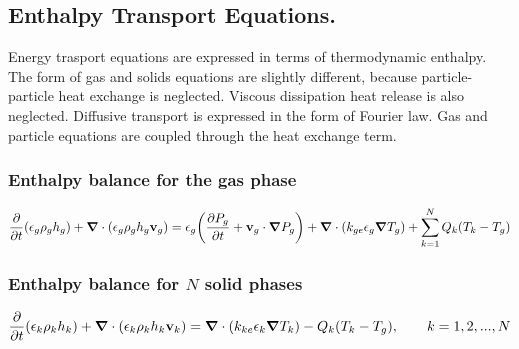 \subsection{Enthalpy Transport Equations.}
Energy trasport equations are expressed in terms of thermodynamic enthalpy.
The form of gas and solids equations are slightly different, because
particle-particle heat exchange is neglected. Viscous dissipation heat 
release is also neglected. Diffusive transport is expressed in the form
of Fourier law. Gas and particle equations are coupled through
the heat exchange term.

\subsubsection{\hspace{1cm}Enthalpy balance for the gas phase}

\begin{equation}
\frac{\partial}{\partial t}(\epsilon_{g}\rho_{g}h_{g})+
\mbox{\boldmath $\nabla$}\cdot (\epsilon_{g}\rho_{g}h_{g}{\bf v}_{g})=
\epsilon_{g}\bigg(\frac{\partial P_{g}}{\partial t}+{\bf v}_{g}\cdot
\mbox{\boldmath $\nabla$}P_{g}\bigg) +
\mbox{\boldmath $\nabla$}\cdot (k_{ge}\epsilon_{g}
\mbox{\boldmath $\nabla$}T_{g})+\sum_{k=1}^{N} Q_{k}(T_{k}-T_{g})
\label{eq:gas_enth}
\end{equation}


\subsubsection{\hspace{1cm}Enthalpy balance for $N$ solid phases}
\begin{equation}
\frac{\partial}{\partial t}(\epsilon_{k}\rho_{k}h_{k})+
\mbox{\boldmath $\nabla$}\cdot (\epsilon_{k}\rho_{k}h_{k}{\bf v}_{k})=
\mbox{\boldmath $\nabla$}\cdot (k_{ke}\epsilon_{k}\mbox{\boldmath 
$\nabla$}T_{k})
-Q_{k}(T_{k}-T_{g}), \hbox{\qquad $k = 1,2,...,N$}
\label{eq:solid_enth}
\end{equation}

